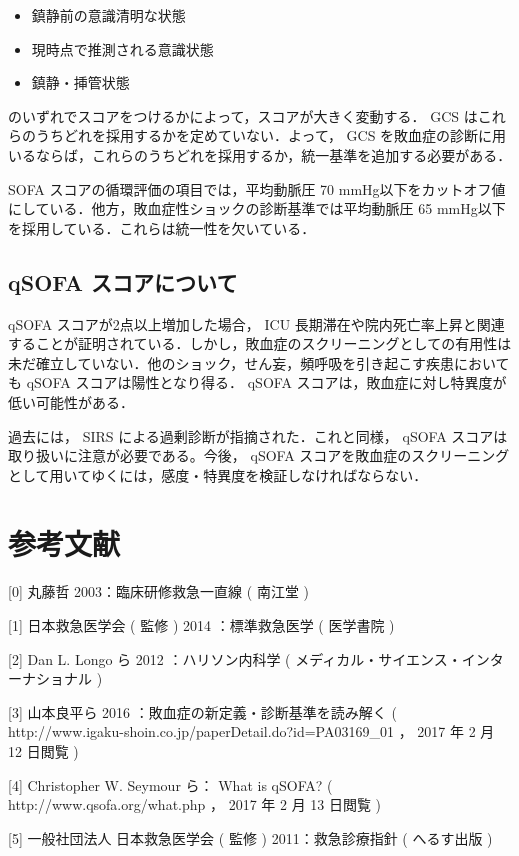 \documentclass[10pt,uplatex]{jsarticle}
\begin{document}
\begin{itemize}
\item 鎮静前の意識清明な状態
\item 現時点で推測される意識状態
\item 鎮静・挿管状態
\end{itemize}

のいずれでスコアをつけるかによって，スコアが大きく変動する． GCS はこれらのうちどれを採用するかを定めていない．よって， GCS を敗血症の診断に用いるならば，これらのうちどれを採用するか，統一基準を追加する必要がある．

SOFA スコアの循環評価の項目では，平均動脈圧 70 mmHg以下をカットオフ値にしている．他方，敗血症性ショックの診断基準では平均動脈圧 65 mmHg以下を採用している．これらは統一性を欠いている．

\subsection{qSOFA スコアについて}

qSOFA スコアが2点以上増加した場合， ICU 長期滞在や院内死亡率上昇と関連することが証明されている．しかし，敗血症のスクリーニングとしての有用性は未だ確立していない．他のショック，せん妄，頻呼吸を引き起こす疾患においても qSOFA スコアは陽性となり得る． qSOFA スコアは，敗血症に対し特異度が低い可能性がある．

過去には， SIRS による過剰診断が指摘された．これと同様， qSOFA スコアは取り扱いに注意が必要である。今後， qSOFA スコアを敗血症のスクリーニングとして用いてゆくには，感度・特異度を検証しなければならない． 

\section*{参考文献}

[0] 丸藤哲 2003：臨床研修救急一直線 ( 南江堂 )

[1] 日本救急医学会 ( 監修 ) 2014 ：標準救急医学 ( 医学書院 )

[2] Dan L. Longo ら 2012 ：ハリソン内科学 ( メディカル・サイエンス・インターナショナル )

[3] 山本良平ら 2016 ：敗血症の新定義・診断基準を読み解く ( http://www.igaku-shoin.co.jp/paperDetail.do?id=PA03169\_01 ， 2017 年 2 月 12 日閲覧 )

[4] Christopher W. Seymour ら： What is qSOFA? ( http://www.qsofa.org/what.php ， 2017 年 2 月 13 日閲覧 )

[5] 一般社団法人 日本救急医学会 ( 監修 ) 2011：救急診療指針 ( へるす出版 )
\end{document}
